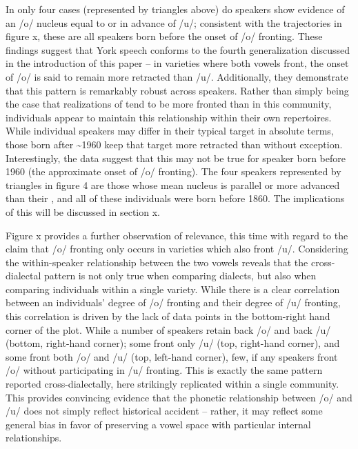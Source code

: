 \documentclass[12pt]{article}
\begin{document}
In only four cases (represented by triangles above) do speakers show evidence of an /o/ nucleus equal to or in advance of /u/; consistent with the trajectories in figure x, these are all speakers born before the onset of /o/ fronting. These findings suggest that York speech conforms to the fourth generalization discussed in the introduction of this paper -- in varieties where both vowels front, the onset of /o/ is said to remain more retracted than /u/. Additionally, they demonstrate that this pattern is remarkably robust across speakers. Rather than simply being the case that realizations of  tend to be more fronted than  in this community, individuals appear to maintain this relationship within their own repertoires. While individual speakers may differ in their typical  target in absolute terms, those born after \textasciitilde1960 keep that target more retracted than  without exception. Interestingly, the data suggest that this may not be true for speaker born before 1960 (the approximate onset of /o/ fronting). The four speakers represented by triangles in figure 4 are those whose mean  nucleus is parallel or more advanced than their , and all of these individuals were born before 1860. The implications of this will be discussed in section x.

Figure x provides a further observation of relevance, this time with regard to the claim that /o/ fronting only occurs in varieties which also front /u/. Considering the within-speaker relationship between the two vowels reveals that the cross-dialectal pattern is not only true when comparing dialects, but also when comparing individuals within a single variety.  While there is a clear correlation between an individuals' degree of /o/ fronting and their degree of /u/ fronting, this correlation is driven by the lack of data points in the bottom-right hand corner of the plot. While a number of speakers retain back /o/ and back /u/ (bottom, right-hand corner); some front only /u/ (top, right-hand corner), and some front both /o/ and /u/ (top, left-hand corner), few, if any speakers front /o/ without participating in /u/ fronting. This is exactly the same pattern reported cross-dialectally, here strikingly replicated within a single community. This provides convincing evidence that the phonetic relationship between /o/ and /u/ does not simply reflect historical accident -- rather, it may reflect some general bias in favor of preserving a vowel space with particular internal relationships.
\end{document}
